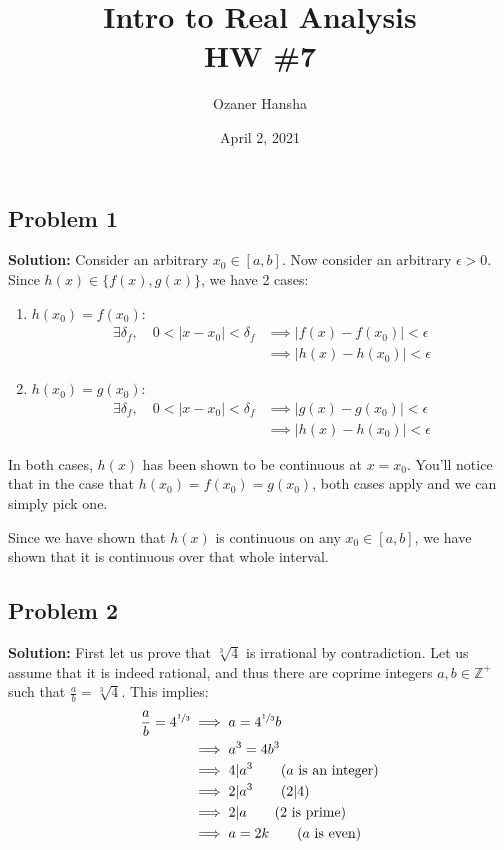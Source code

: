 \documentclass{article}
\newcommand{\Z}{\mathbb Z}
\begin{document}
\title{Intro to Real Analysis\\HW \#7}
\author{Ozaner Hansha}
\date{April 2, 2021}
\maketitle

\subsection*{Problem 1}
\noindent\textbf{Solution:} Consider an arbitrary $x_0\in[a,b]$. Now consider an arbitrary $\epsilon>0$. Since $h(x)\in\{f(x),g(x)\}$, we have 2 cases:
\begin{enumerate}
  \item $h(x_0)=f(x_0)$:
  \begin{align*}
    \exists\delta_f,\quad 0<|x-x_0|<\delta_f&\implies|f(x)-f(x_0)|<\epsilon\tag{$f(x)$ is continuous}\\
    &\implies|h(x)-h(x_0)|<\epsilon\tag{$h(x_0)=f(x_0)$}
  \end{align*}
  \item $h(x_0)=g(x_0)$:
  \begin{align*}
    \exists\delta_f,\quad 0<|x-x_0|<\delta_f&\implies|g(x)-g(x_0)|<\epsilon\tag{$g(x)$ is continuous}\\
    &\implies|h(x)-h(x_0)|<\epsilon\tag{$h(x_0)=g(x_0)$}
  \end{align*}
\end{enumerate}

In both cases, $h(x)$ has been shown to be continuous at $x=x_0$. You'll notice that in the case that $h(x_0)=f(x_0)=g(x_0)$, both cases apply and we can simply pick one.

Since we have shown that $h(x)$ is continuous on any $x_0\in[a,b]$, we have shown that it is continuous over that whole interval.

\subsection*{Problem 2}
\noindent\textbf{Solution:} First let us prove that $\sqrt[3]{4}$ is irrational by contradiction. Let us assume that it is indeed rational, and thus there are coprime integers $a,b\in\Z^+$ such that $\frac{a}{b}=\sqrt[3]{4}$. This implies:
\begin{align*}
  \frac{a}{b}=4^{\sfrac{1}{3}}&\implies a=4^{\sfrac{1}{3}}b\\
  &\implies a^3=4b^3\\
  &\implies 4|a^3\tag{$a$ is an integer}\\
  &\implies 2|a^3\tag{$2|4$}\\
  &\implies 2|a\tag{2 is prime}\\
  &\implies a=2k\tag{$a$ is even}
\end{align*}
\end{document}
